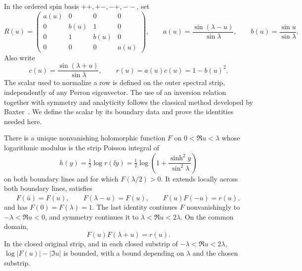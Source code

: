 In the ordered spin basis $++,+-,-+,--$, set
\begin{equation}\label{angular:R}
 R(u)=
 \begin{pmatrix}
 a(u)&0&0&0\\
 0&b(u)&1&0\\
 0&1&b(u)&0\\
 0&0&0&a(u)
 \end{pmatrix},\qquad
 a(u)=\frac{\sin(\lambda-u)}{\sin\lambda},\qquad
 b(u)=\frac{\sin u}{\sin\lambda}.
\end{equation}
Also write
\begin{equation}\label{angular:acr}
 c(u)=\frac{\sin(\lambda+u)}{\sin\lambda},\qquad
 r(u)=a(u)c(u)=1-b(u)^2.
\end{equation}
The scalar used to normalize a row is defined on the outer spectral
strip, independently of any Perron eigenvector.  The use of an inversion
relation together with symmetry and analyticity follows the classical
method developed by Baxter~\cite{Baxter1982Inversion}.  We define the
scalar by its boundary data and prove the identities needed here.

\begin{lemma}\label{angular:scalar-normalizer}
There is a unique nonvanishing holomorphic function $F$ on
$0<\Re u<\lambda$ whose logarithmic modulus is the strip Poisson
integral of
\[
 h(y)=\tfrac12\log r(\ii y)
     =\tfrac12\log\left(1+\frac{\sinh^2 y}{\sin^2\lambda}\right)
\]
on both boundary lines and for which $F(\lambda/2)>0$.
It extends locally across both boundary lines, satisfies
\begin{equation}\label{angular:F-symmetries}
 F(\bar u)=\overline{F(u)},\qquad
 F(\lambda-u)=F(u),\qquad
 F(u)F(-u)=r(u),
\end{equation}
and has $F(0)=F(\lambda)=1$.  The last identity continues $F$
nonvanishingly to $-\lambda<\Re u<0$, and symmetry continues it to
$\lambda<\Re u<2\lambda$.  On the common domain,
\begin{equation}\label{angular:F-fusion}
 F(u)F(\lambda+u)=r(u).
\end{equation}
In the closed original strip, and in each closed substrip of
$-\lambda<\Re u<2\lambda$,
$\log|F(u)|-|\Im u|$ is bounded, with a bound depending on
$\lambda$ and the chosen substrip.
\end{lemma}


